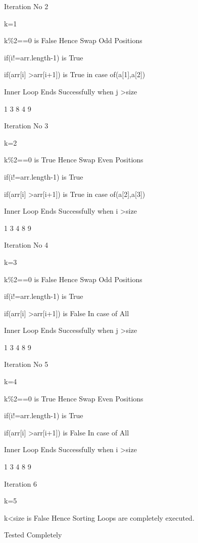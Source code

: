 \documentclass[a4paper,12pt]{article}
\begin{document}
Iteration No 2\par
k=1\par
k\%2==0 is False Hence Swap Odd Positions\par
if(i!=arr.length-1) is True\par
if(arr[i] \textgreater arr[i+1]) is True in case of{(a[1],a[2])}\par
Inner Loop Ends Successfully when j \textgreater size\par
1 3 8 4 9\\\par


Iteration No 3\par
k=2\par
k\%2==0 is True Hence Swap Even Positions\par
if(i!=arr.length-1) is True\par
if(arr[i] \textgreater arr[i+1]) is True in case of{(a[2],a[3])}\par
Inner Loop Ends Successfully when i \textgreater size\par
1 3 4 8 9\\\par


Iteration No 4\par
k=3\par
k\%2==0 is False Hence Swap Odd Positions\par
if(i!=arr.length-1) is True\par  
if(arr[i] \textgreater arr[i+1]) is False In case of All\par
Inner Loop Ends Successfully when j \textgreater size\par
1 3 4 8 9\\\par


Iteration No 5\par
k=4\par
k\%2==0 is True Hence Swap Even Positions\par
if(i!=arr.length-1) is True\par
if(arr[i] \textgreater arr[i+1]) is False In case of All\par
Inner Loop Ends Successfully when i \textgreater size\par
1 3 4 8 9\\\par

Iteration 6\par
k=5\par
k<size is False Hence Sorting Loops are completely executed.\par
Tested Completely\\\par
\end{document}
